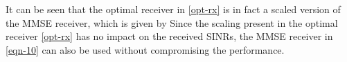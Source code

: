 It can be seen that the optimal receiver in \eqref{opt-rx} is in fact a scaled version of the \ac{MMSE} receiver, which is given by
Since the scaling present in the optimal receiver \eqref{opt-rx} has no impact on the received \acp{SINR}, the \ac{MMSE} receiver in \eqref{eqn-10} can also be used without compromising the performance.

